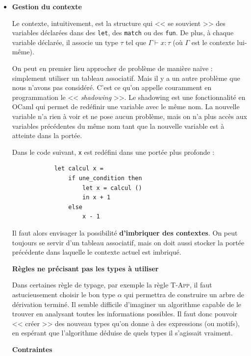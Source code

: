 \documentclass[11pt]{article}
\begin{document}
\begin{itemize}
    \item \textbf{Gestion du contexte}
    
    Le contexte, intuitivement, est la structure qui << se souvient >> des variables déclarées dans des \lstinline|let|, des \lstinline|match| ou des \lstinline|fun|. De plus, à chaque variable déclarée, il associe un type $\tau$ tel que $\Gamma\vdash x:\tau$ (où $\Gamma$ est le contexte lui-même).

    On peut en premier lieu approcher de problème de manière naïve : simplement utiliser un tableau associatif. Mais il y a un autre problème que nous n'avons pas considéré. C'est ce qu'on appelle couramment en programmation le << \textit{shadowing} >>. Le shadowing est une fonctionnalité en OCaml qui permet de redéfinir une variable avec le même nom. La nouvelle variable n'a rien à voir et ne pose aucun problème, mais on n'a plus accès aux variables précédentes du même nom tant que la nouvelle variable est à atteinte dans la portée.

    \begin{example}
        Dans le code suivant, \verb|x| est redéfini dans une portée plus profonde :
        \begin{lstlisting}
            let calcul x = 
                if une_condition then
                    let x = calcul ()
                    in x + 1
                else
                    x - 1
        \end{lstlisting}
    \end{example}

    Il faut alors envisager la possibilité \textbf{d'imbriquer des contextes}. On peut toujours se servir d'un tableau associatif, mais on doit aussi stocker la portée précédente dans laquelle le contexte actuel est imbriqué.

    \textbf{Règles ne précisant pas les types à utiliser}

    Dans certaines règle de typage, par exemple la règle {\scshape{T-App}}, il faut astucieusement choisir le bon type $\alpha$ qui permettra de construire un arbre de dérivation terminé. Il semble difficile d'imaginer un algorithme capable de le trouver en analysant toutes les informations possibles. Il faut donc pouvoir << créer >> des nouveau types qu'on donne à des expressions (ou motifs), en espérant que l'algorithme déduise de quels types il s'agissait vraiment.

    \textbf{Contraintes}


\end{itemize}
\end{document}
